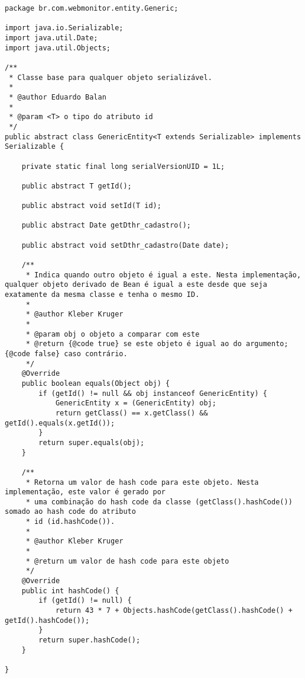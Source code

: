 \begin{lstlisting}[style=Java, label=Func:GenericEntity,caption={[Entidade genérica da aplicação GenericEntity.]Entidade genérica da aplicação GenericEntity e suas funcionalidades.}]
package br.com.webmonitor.entity.Generic;

import java.io.Serializable;
import java.util.Date;
import java.util.Objects;

/**
 * Classe base para qualquer objeto serializável.
 *
 * @author Eduardo Balan
 *
 * @param <T> o tipo do atributo id
 */
public abstract class GenericEntity<T extends Serializable> implements Serializable {

    private static final long serialVersionUID = 1L;

    public abstract T getId();

    public abstract void setId(T id);

    public abstract Date getDthr_cadastro();

    public abstract void setDthr_cadastro(Date date);

    /**
     * Indica quando outro objeto é igual a este. Nesta implementação, qualquer objeto derivado de Bean é igual a este desde que seja exatamente da mesma classe e tenha o mesmo ID.
     *
     * @author Kleber Kruger
     *
     * @param obj o objeto a comparar com este
     * @return {@code true} se este objeto é igual ao do argumento; {@code false} caso contrário.
     */
    @Override
    public boolean equals(Object obj) {
        if (getId() != null && obj instanceof GenericEntity) {
            GenericEntity x = (GenericEntity) obj;
            return getClass() == x.getClass() && getId().equals(x.getId());
        }
        return super.equals(obj);
    }

    /**
     * Retorna um valor de hash code para este objeto. Nesta implementação, este valor é gerado por
     * uma combinação do hash code da classe (getClass().hashCode()) somado ao hash code do atributo
     * id (id.hashCode()).
     *
     * @author Kleber Kruger
     *
     * @return um valor de hash code para este objeto
     */
    @Override
    public int hashCode() {
        if (getId() != null) {
            return 43 * 7 + Objects.hashCode(getClass().hashCode() + getId().hashCode());
        }
        return super.hashCode();
    }

}
\end{lstlisting}

